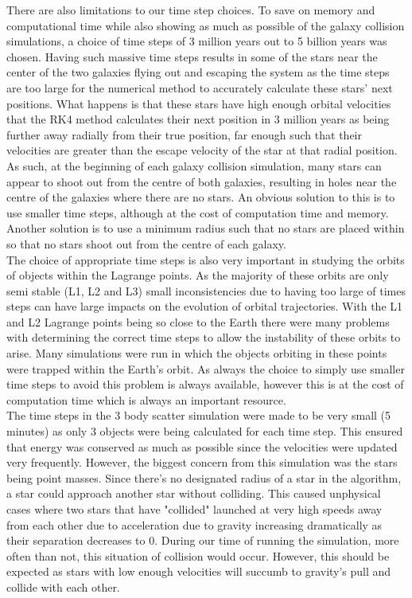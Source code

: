 \documentclass[10pt,letterpaper]{article}
\begin{document}
There are also limitations to our time step choices. To save on memory and computational time while also showing as much as possible of the galaxy collision simulations, a choice of time steps of 3 million years out to 5 billion years was chosen. Having such massive time steps results in some of the stars near the center of the two galaxies flying out and escaping the system as the time steps are too large for the numerical method to accurately calculate these stars' next positions. What happens is that these stars have high enough orbital velocities that the RK4 method calculates their next position in 3 million years as being further away radially from their true position, far enough such that their velocities are greater than the escape velocity of the star at that radial position. As such, at the beginning of each galaxy collision simulation, many stars can appear to shoot out from the centre of both galaxies, resulting in holes near the centre of the galaxies where there are no stars. An obvious solution to this is to use smaller time steps, although at the cost of computation time and memory. Another solution is to use a minimum radius such that no stars are placed within so that no stars shoot out from the centre of each galaxy.\\

The choice of appropriate time steps is also very important in studying the orbits of objects within the Lagrange points. As the majority of these orbits are only semi stable (L1, L2 and L3) small inconsistencies due to having too large of times steps can have large impacts on the evolution of orbital trajectories. With the L1 and L2 Lagrange points being so close to the Earth there were many problems with determining the correct time steps to allow the instability of these orbits to arise. Many simulations were run in which the objects orbiting in these points were trapped within the Earth's orbit. As always the choice to simply use smaller time steps to avoid this problem is always available, however this is at the cost of computation time which is always an important resource.\\

The time steps in the 3 body scatter simulation were made to be very small (5 minutes) as only 3 objects were being calculated for each time step. This ensured that energy was conserved as much as possible since the velocities were updated very frequently. However, the biggest concern from this simulation was the stars being point masses. Since there's no designated radius of a star in the algorithm, a star could approach another star without colliding. This caused unphysical cases where two stars that have "collided" launched at very high speeds away from each other due to acceleration due to gravity increasing dramatically as their separation decreases to 0. During our time of running the simulation, more often than not, this situation of collision would occur. However, this should be expected as stars with low enough velocities will succumb to gravity's pull and collide with each other.\\
\end{document}
